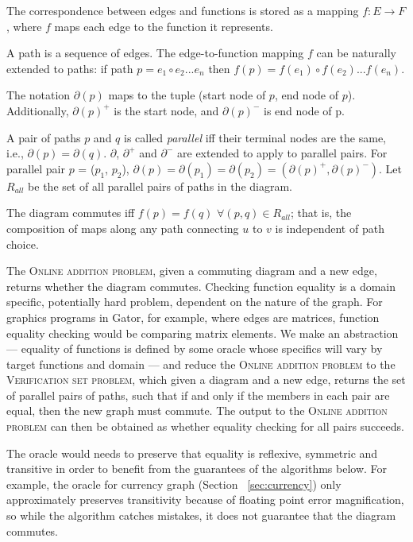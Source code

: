 \documentclass[sigplan,review,anonymous]{acmart}
\begin{document}
The correspondence between edges and functions is stored as a mapping $f:E\rightarrow F$, where $f$ maps each edge to the function it represents.

A path is a sequence of edges. The edge-to-function mapping $f$ can be naturally extended to paths: if path $p=e_1\circ e_2 ... e_n$ then $f(p)=f(e_1) \circ f(e_2) ... f(e_n)$.

The notation $\partial(p)$ maps to the tuple (start node of $p$, end node of $p$).
Additionally, $\partial(p)^{+}$ is the start node, and $\partial(p)^{-}$ is end node of p.


A pair of paths $p$ and $q$ is called \textit{parallel} iff their terminal nodes are the same, i.e., $\partial(p)=\partial(q)$.
$\partial$, $\partial^{+}$ and $\partial^{-}$ are extended to apply to parallel pairs. For parallel pair $p$ = ($p_1$, $p_2$), $\partial(p)=\partial(p_1)=\partial(p_2)=(\partial(p)^{+}, \partial(p)^{-})$.
Let $R_{all}$ be the set of all parallel pairs of paths in the diagram.

The diagram commutes iff $f(p)=f(q)$ $\forall (p,q)\in R_{all}$; that is, the composition of maps along any path connecting $u$ to $v$ is independent of path choice.

The \textsc{Online addition problem}, given a commuting diagram and a new edge, returns whether the diagram commutes.
Checking function equality is a domain specific, potentially hard problem, dependent on the nature of the graph.
For graphics programs in Gator, for example, where edges are matrices, function equality checking would be comparing matrix elements.
We make an abstraction --- equality of functions is defined by some oracle whose specifics will vary by target functions and domain --- and reduce the \textsc{Online addition problem} to the \textsc{Verification set problem}, which given a diagram and a new edge, returns the set of parallel pairs of paths, such that if and only if the members in each pair are equal, then the new graph must commute.
The output to the \textsc{Online addition problem} can then be obtained as whether equality checking for all pairs succeeds.

The oracle would needs to preserve that equality is reflexive, symmetric and transitive in order to benefit from the guarantees of the algorithms below.
For example, the oracle for currency graph (Section ~\ref{sec:currency}) only approximately preserves transitivity because of floating point error magnification, so while the algorithm catches mistakes, it does not guarantee that the diagram commutes.
\end{document}
